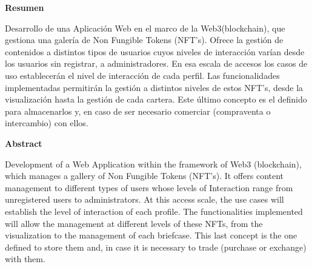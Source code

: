 {\setlength{\parskip}{8mm}
{\huge{\textbf{Resumen}}}

    {\large{ 
        Desarrollo de una Aplicación Web en el marco de la Web3(blockchain), que gestiona una galería de 
        Non Fungible Tokens (NFT’s). Ofrece la gestión de contenidos a distintos tipos de usuarios cuyos niveles de
        interacción varían desde los usuarios sin registrar, a administradores. En esa escala de accesos los
        casos de uso establecerán el nivel de interacción de cada perfil. Las funcionalidades implementadas
        permitirán la gestión a distintos niveles de estos NFT’s, desde la visualización hasta la gestión de cada
        cartera. Este último concepto es el definido para almacenarlos y, en caso de ser necesario comerciar
        (compraventa o intercambio) con ellos.
    }}

\newpage

{\huge{\textbf{Abstract}}}

    {\large{
        Development of a Web Application within the framework of Web3 (blockchain), which manages a gallery of
        Non Fungible Tokens (NFT's). It offers content management to different types of users whose levels of
        Interaction range from unregistered users to administrators. At this access scale, the
        use cases will establish the level of interaction of each profile. The functionalities implemented
        will allow the management at different levels of these NFTs, from the visualization to the management of each
        briefcase. This last concept is the one defined to store them and, in case it is necessary to trade
        (purchase or exchange) with them.
    }}

}